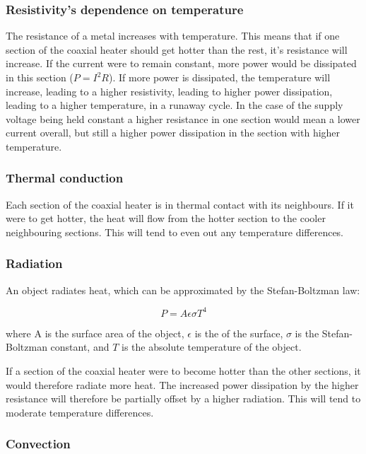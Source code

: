 \subsubsection{Resistivity's dependence on temperature}

The resistance of a metal increases with temperature. This means that if one
section of the coaxial heater should get hotter than the rest, it's resistance
will increase. If the current were to remain constant, more power would be
dissipated in this section (\(P=I^2R\)). If more power is dissipated, the
temperature will increase, leading to a higher resistivity, leading to higher
power dissipation, leading to a higher temperature, in a runaway cycle. In the
case of the supply voltage being held constant a higher resistance in one section
would mean a lower current overall, but still a higher power dissipation in the
section with higher temperature.

\subsubsection{Thermal conduction}

Each section of the coaxial heater is in thermal contact with its neighbours. If
it were to get hotter, the heat will flow from the hotter section to the cooler
neighbouring sections. This will tend to even out any temperature differences.

\subsubsection{Radiation}

An object radiates heat, which can be approximated by the Stefan-Boltzman law:

\begin{equation}\label{eq:1}
	P=A \epsilon \sigma T^4
\end{equation}

where A is the surface area of the object, \(\epsilon\) is the
 of the surface, \(\sigma\) is the Stefan-Boltzman constant,
and \(T\) is the absolute temperature of the object. 

If a section of the coaxial heater were to become hotter than the other
sections, it would therefore radiate more heat. The increased power dissipation
by the higher resistance will therefore be partially offset by a higher
radiation. This will tend to moderate temperature differences.

\subsubsection{Convection}

